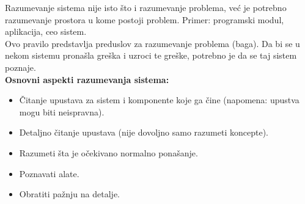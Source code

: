 \documentclass[a4paper]{article}
\begin{document}
  Razumevanje sistema nije isto što i razumevanje problema, već je potrebno razumevanje
  prostora u kome postoji problem. Primer: programski modul, aplikacija, ceo sistem.\\
  \indent Ovo pravilo predstavlja preduslov za razumevanje problema (baga). Da bi se u nekom
  sistemu pronašla greška i uzroci te greške, potrebno je da se taj sistem poznaje.\\
  \textbf{Osnovni aspekti razumevanja sistema:}
  \begin{itemize}
    \item Čitanje upustava za sistem i komponente koje ga čine (napomena: upustva mogu
          biti neispravna).
    \item Detaljno čitanje upustava (nije dovoljno samo razumeti koncepte).
    \item Razumeti šta je očekivano normalno ponašanje.
    \item Poznavati alate.
    \item Obratiti pažnju na detalje.
  \end{itemize}
\end{document}
